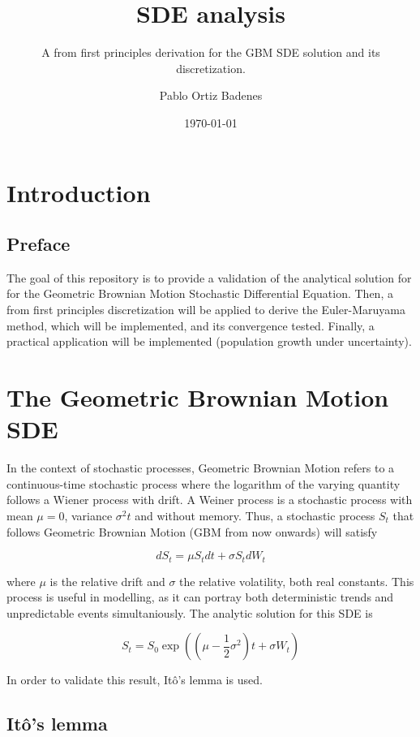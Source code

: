 \documentclass[11pt,oneside,parskip=half]{scrbook}  %
\title{\Huge\bfseries\sffamily SDE analysis}
\subtitle{\large A from first principles derivation for the GBM SDE solution and its discretization.}
\author{Pablo Ortiz Badenes}
\date{\today}
\begin{document}
\frontmatter
\maketitle
\tableofcontents
\listoffigures

\mainmatter

\chapter{Introduction}
\section{Preface}

The goal of this repository is to provide a validation of the analytical solution for for the Geometric Brownian Motion Stochastic Differential Equation. Then, a from first principles discretization will be applied to derive the Euler-Maruyama method, which will be implemented, and its convergence tested. Finally, a practical application will be implemented (population growth under uncertainty).

\chapter{The Geometric Brownian Motion SDE}

In the context of stochastic processes, Geometric Brownian Motion refers to a continuous-time stochastic process where the logarithm of the varying quantity follows a Wiener process with drift. A Weiner process is a stochastic process with mean $\mu=0$, variance $\sigma^2t$ and without memory. Thus, a stochastic process $S_t$ that follows Geometric Brownian Motion (GBM from now onwards) will satisfy

$$
dS_t=\mu S_t dt+ \sigma S_tdW_t
$$

where $\mu$ is the relative drift and $\sigma$ the relative volatility, both real constants. This process is useful in modelling, as it can portray both deterministic trends and unpredictable events simultaniously. The analytic solution for this SDE is

$$
S_t = S_0 \exp\left( \left(\mu - \frac{1}{2}\sigma^2 \right)t + \sigma W_t \right)
$$

In order to validate this result, Itô's lemma is used.

\section{Itô's lemma}
\end{document}
